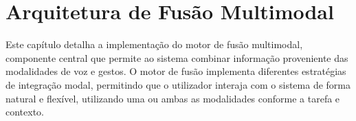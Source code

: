 \documentclass{report}
\begin{document}

\chapter{Arquitetura de Fusão Multimodal}


Este capítulo detalha a implementação do motor de fusão multimodal, componente central que permite ao sistema combinar informação proveniente das modalidades de voz e gestos. O motor de fusão implementa diferentes estratégias de integração modal, permitindo que o utilizador interaja com o sistema de forma natural e flexível, utilizando uma ou ambas as modalidades conforme a tarefa e contexto.
\end{document}
